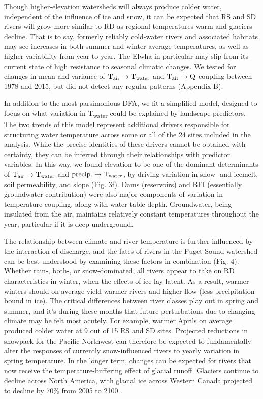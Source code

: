 \documentclass[notitlepage]{article}
\begin{document}
Though higher-elevation watersheds will always produce colder water, independent of the influence of ice and snow, it can be expected that RS and SD rivers will grow more similar to RD as regional temperatures warm and glaciers decline. That is to say, formerly reliably cold-water rivers and associated habitats may see increases in both summer and winter average temperatures, as well as higher variability from year to year. The Elwha in particular may slip from its current state of high resistance to seasonal climatic changes. We tested for changes in mean and variance of $\textrm{T}\textsubscript{air}\rightarrow \textrm{T}\textsubscript{water}$ and $\textrm{T}\textsubscript{air}\rightarrow \textrm{Q}$ coupling between 1978 and 2015, but did not detect any regular patterns (Appendix B).

In addition to the most parsimonious DFA, we fit a simplified model, designed to focus on what variation in T\textsubscript{water} could be explained by landscape predictors. The two trends of this model represent additional drivers responsible for structuring water temperature across some or all of the 24 sites included in the analysis. While the precise identities of these drivers cannot be obtained with certainty, they can be inferred through their relationships with predictor variables. In this way, we found elevation to be one of the dominant determinants of $\textrm{T}\textsubscript{air}\rightarrow \textrm{T}\textsubscript{water}$ and $\textrm{precip.}\rightarrow \textrm{T}\textsubscript{water}$, by driving variation in snow- and icemelt, soil permeability, and slope (Fig. 3f). Dams (reservoirs) and BFI (essentially groundwater contribution) were also major components of variation in temperature coupling, along with water table depth. Groundwater, being insulated from the air, maintains relatively constant temperatures throughout the year, particular if it is deep underground.

The relationship between climate and river temperature is further influenced by the interaction of discharge, and the fates of rivers in the Puget Sound watershed can be best understood by examining these factors in combination (Fig. 4). Whether rain-, both-, or snow-dominated, all rivers appear to take on RD characteristics in winter, when the effects of ice lay latent. As a result, warmer winters should on average yield warmer rivers and higher flow (less precipitation bound in ice). The critical differences between river classes play out in spring and summer, and it's during these months that future perturbations due to changing climate may be felt most acutely. For example, warmer Aprils on average produced colder water at 9 out of 15 RS and SD sites. Projected reductions in snowpack for the Pacific Northwest can therefore be expected to fundamentally alter the responses of currently snow-influenced rivers to yearly variation in spring temperature. In the longer term, changes can be expected for rivers that now receive the temperature-buffering effect of glacial runoff. Glaciers continue to decline across North America, with glacial ice across Western Canada projected to decline by 70\% from 2005 to 2100 \citep{clarke2015projected}.
\end{document}
